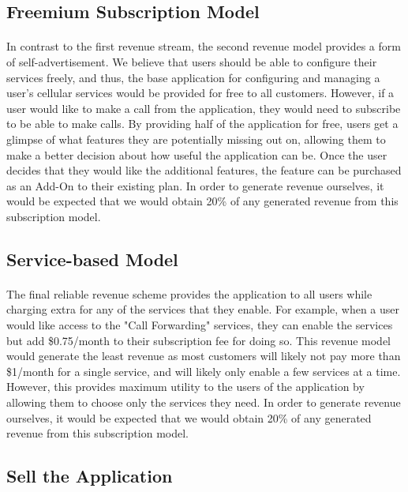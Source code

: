 \documentclass[12pt]{article}
\begin{document}
\subsection{Freemium Subscription Model}
\paragraph{}
In contrast to the first revenue stream, the second revenue model provides a form of self-advertisement. We believe that users should be able to configure their services freely, and thus, the base application for configuring and managing a user’s cellular services would be provided for free to all customers. However, if a user would like to make a call from the application, they would need to subscribe to be able to make calls. By providing half of the application for free, users get a glimpse of what features they are potentially missing out on, allowing them to make a better decision about how useful the application can be. Once the user decides that they would like the additional features, the feature can be purchased as an Add-On to their existing plan. In order to generate revenue ourselves, it would be expected that we would obtain 20\% of any generated revenue from this subscription model.

\subsection{Service-based Model}
\paragraph{}
The final reliable revenue scheme provides the application to all users while charging extra for any of the services that they enable. For example, when a user would like access to the "Call Forwarding" services, they can enable the services but add \$0.75/month to their subscription fee for doing so. This revenue model would generate the least revenue as most customers will likely not pay more than \$1/month for a single service, and will likely only enable a few services at a time. However, this provides maximum utility to the users of the application by allowing them to choose only the services they need. In order to generate revenue ourselves, it would be expected that we would obtain 20\% of any generated revenue from this subscription model.

\subsection{Sell the Application}
\end{document}
